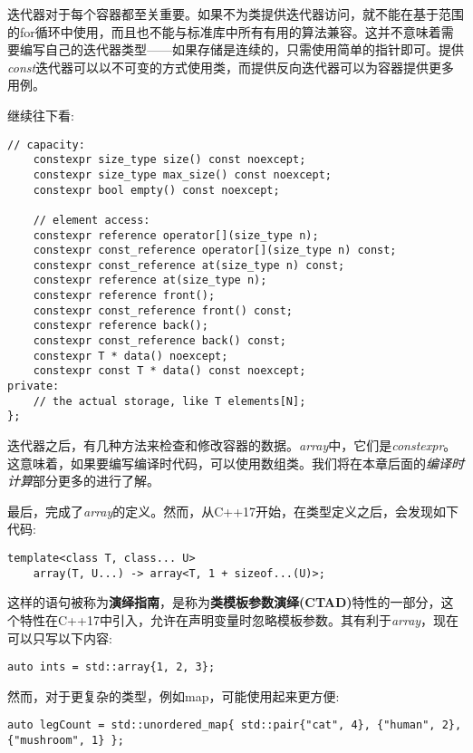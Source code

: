 迭代器对于每个容器都至关重要。如果不为类提供迭代器访问，就不能在基于范围的for循环中使用，而且也不能与标准库中所有有用的算法兼容。这并不意味着需要编写自己的迭代器类型——如果存储是连续的，只需使用简单的指针即可。提供\textit{const}迭代器可以以不可变的方式使用类，而提供反向迭代器可以为容器提供更多用例。

继续往下看:

\begin{lstlisting}[style=styleCXX]
	// capacity:
	constexpr size_type size() const noexcept;
	constexpr size_type max_size() const noexcept;
	constexpr bool empty() const noexcept;
	
	// element access:
	constexpr reference operator[](size_type n);
	constexpr const_reference operator[](size_type n) const;
	constexpr const_reference at(size_type n) const;
	constexpr reference at(size_type n);
	constexpr reference front();
	constexpr const_reference front() const;
	constexpr reference back();
	constexpr const_reference back() const;
	constexpr T * data() noexcept;
	constexpr const T * data() const noexcept;
private:
	// the actual storage, like T elements[N];
};
\end{lstlisting}

迭代器之后，有几种方法来检查和修改容器的数据。\textit{array}中，它们是\textit{constexpr}。这意味着，如果要编写编译时代码，可以使用数组类。我们将在本章后面的\textit{编译时计算}部分更多的进行了解。

最后，完成了\textit{array}的定义。然而，从C++17开始，在类型定义之后，会发现如下代码:

\begin{lstlisting}[style=styleCXX]
template<class T, class... U>
	array(T, U...) -> array<T, 1 + sizeof...(U)>;
\end{lstlisting}

这样的语句被称为\textbf{演绎指南}，是称为\textbf{类模板参数演绎(CTAD)}特性的一部分，这个特性在C++17中引入，允许在声明变量时忽略模板参数。其有利于\textit{array}，现在可以只写以下内容:

\begin{lstlisting}[style=styleCXX]
auto ints = std::array{1, 2, 3};
\end{lstlisting}

然而，对于更复杂的类型，例如map，可能使用起来更方便:

\begin{lstlisting}[style=styleCXX]
auto legCount = std::unordered_map{ std::pair{"cat", 4}, {"human", 2}, {"mushroom", 1} };
\end{lstlisting}

